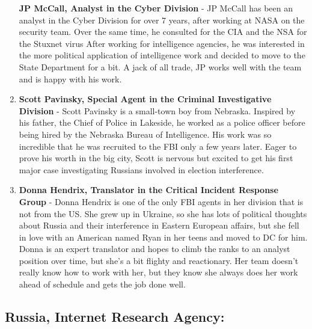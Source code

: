 \documentclass[10pt, letterpaper]{article}
\begin{document}
\begin{enumerate}
  \textbf{JP McCall, Analyst in the Cyber Division} - JP McCall has been
  an analyst in the Cyber Division for over 7 years, after working at
  NASA on the security team. Over the same time, he consulted for the
  CIA and the NSA for the Stuxnet virus After working for intelligence
  agencies, he was interested in the more political application of
  intelligence work and decided to move to the State Department for a
  bit. A jack of all trade, JP works well with the team and is happy
  with his work.
\item
  \textbf{Scott Pavinsky, Special Agent in the Criminal Investigative
  Division} - Scott Pavinsky is a small-town boy from Nebraska. Inspired
  by his father, the Chief of Police in Lakeside, he worked as a police
  officer before being hired by the Nebraska Bureau of Intelligence. His
  work was so incredible that he was recruited to the FBI only a few
  years later. Eager to prove his worth in the big city, Scott is
  nervous but excited to get his first major case investigating Russians
  involved in election interference.
\item
  \textbf{Donna Hendrix, Translator in the Critical Incident Response
  Group} - Donna Hendrix is one of the only FBI agents in her division
  that is not from the US. She grew up in Ukraine, so she has lots of
  political thoughts about Russia and their interference in Eastern
  European affairs, but she fell in love with an American named Ryan in
  her teens and moved to DC for him. Donna is an expert translator and
  hopes to climb the ranks to an analyst position over time, but she's a
  bit flighty and reactionary. Her team doesn't really know how to work
  with her, but they know she always does her work ahead of schedule and
  gets the job done well.
\end{enumerate}

\newpage
\subsection{Russia, Internet Research Agency:}
\end{document}
